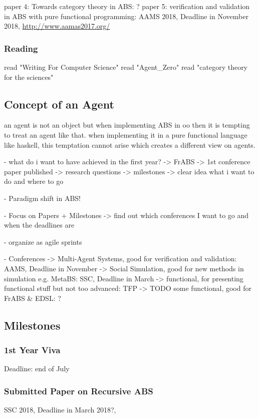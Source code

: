 paper 4: Towards category theory in ABS: ?
paper 5: verification and validation in ABS with pure functional programming: AAMS 2018, Deadline in November 2018, \url{http://www.aamas2017.org/}



\subsubsection{Reading}
read "Writing For Computer Science"
read "Agent\_Zero"
read "category theory for the sciences"


\subsection{Concept of an Agent}
an agent is not an object but when implementing ABS in oo then it is tempting to treat an agent like that. when implementing it in a pure functional language like haskell, this temptation cannot arise which creates a different view on agents.

- what do i want to have achieved in the first year?
	-> FrABS
	-> 1st conference paper published
	-> research questions
	-> milestones
	-> clear idea what i want to do and where to go
	
- Paradigm shift in ABS!

- Focus on Papers + Milestones
	-> find out which conferences I want to go and when the deadlines are

- organize as agile sprints

- Conferences
	-> Multi-Agent Systems, good for verification and validation: 			AAMS, Deadline in November
	-> Social Simulation, good for new methods in simulation e.g. MetaBS: 	SSC, Deadline in March
	-> functional, for presenting functional stuff but not too advanced:	TFP	
	-> TODO some functional, good for FrABS \& EDSL:						?


\subsection{Milestones}

\subsubsection*{1st Year Viva}
Deadline: end of July

\subsubsection*{Submitted Paper on Recursive ABS}
SSC 2018, Deadline in March 2018?, 

